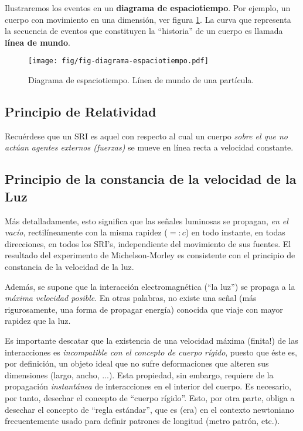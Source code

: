 Ilustraremos los eventos en un \textbf{diagrama de espaciotiempo}. Por ejemplo, un cuerpo con movimiento en una dimensión, ver figura \ref{TER1}. La curva que representa la secuencia de eventos que constituyen la ``historia'' de un cuerpo es llamada \textbf{línea de mundo}.

\begin{figure}[!h]
\centerline{\texttt{[image: fig/fig-diagrama-espaciotiempo.pdf]}}
\caption{Diagrama de espaciotiempo. Línea de mundo de una partícula.}
\label{TER1}
\end{figure}

\subsection{Principio de Relatividad}
\begin{quotation}
\end{quotation}

Recuérdese que un SRI es aquel con respecto al cual un cuerpo \textit{sobre el que no actúan agentes externos (fuerzas)} se mueve en línea recta a velocidad
constante.


\subsection{Principio de la constancia de la velocidad de la Luz}
 \begin{quotation}
\end{quotation}
Más detalladamente, esto significa que las se\~nales luminosas se propagan, \textit{en el vacío}, rectilíneamente con la misma rapidez ($=:c$) en todo instante, en todas direcciones, en todos los SRI's, independiente del movimiento de sus fuentes. El resultado del experimento de Michelson-Morley es consistente con el principio de constancia de la velocidad de la luz.

Además, se supone que la interacción electromagnética (``la luz'') se propaga a la \textit{máxima velocidad posible}. En otras palabras, no existe una se\~nal (más rigurosamente, una forma de propagar energía) conocida que viaje con mayor rapidez que la luz.

Es importante descatar que la existencia de una velocidad máxima (finita!) de las interacciones es \textit{incompatible con el concepto de
cuerpo rígido}, puesto que éste es, por definición, un objeto ideal
que no sufre deformaciones que alteren sus dimensiones (largo, ancho, ...).
Esta propiedad, sin embargo, requiere de la propagación \textit{instantánea} de interacciones en el interior del cuerpo. Es necesario, por tanto, desechar el concepto de ``cuerpo
rígido''. Esto, por otra parte, obliga a desechar el concepto de ``regla
estándar'', que es (era) en el contexto newtoniano frecuentemente usado para definir patrones de longitud (metro patrón, etc.).

